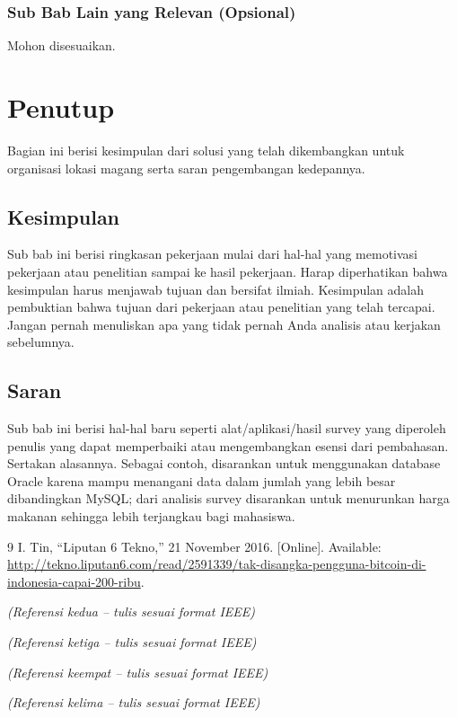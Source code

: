 \documentclass[a4paper,11pt,oneside]{report}
\begin{document}
\subsection{Sub Bab Lain yang Relevan (Opsional)}
Mohon disesuaikan.

\chapter{Penutup}
Bagian ini berisi kesimpulan dari solusi yang telah dikembangkan untuk
organisasi lokasi magang serta saran pengembangan kedepannya.

\section{Kesimpulan}
Sub bab ini berisi ringkasan pekerjaan mulai dari hal-hal yang memotivasi
pekerjaan atau penelitian sampai ke hasil pekerjaan. Harap diperhatikan bahwa
kesimpulan harus menjawab tujuan dan bersifat ilmiah. Kesimpulan adalah
pembuktian bahwa tujuan dari pekerjaan atau penelitian yang telah tercapai.
Jangan pernah menuliskan apa yang tidak pernah Anda analisis atau kerjakan
sebelumnya.

\section{Saran}
Sub bab ini berisi hal-hal baru seperti alat/aplikasi/hasil survey yang
diperoleh penulis yang dapat memperbaiki atau mengembangkan esensi dari
pembahasan. Sertakan alasannya. Sebagai contoh, disarankan untuk menggunakan
database Oracle karena mampu menangani data dalam jumlah yang lebih besar
dibandingkan MySQL; dari analisis survey disarankan untuk menurunkan harga
makanan sehingga lebih terjangkau bagi mahasiswa.

\renewcommand{\bibname}{Daftar Pustaka}
\begin{thebibliography}{9}
I. Tin, ``Liputan 6 Tekno,'' 21 November 2016. [Online]. Available:
\url{http://tekno.liputan6.com/read/2591339/tak-disangka-pengguna-bitcoin-di-indonesia-capai-200-ribu}.

\textit{(Referensi kedua -- tulis sesuai format IEEE)}

\textit{(Referensi ketiga -- tulis sesuai format IEEE)}

\textit{(Referensi keempat -- tulis sesuai format IEEE)}

\textit{(Referensi kelima -- tulis sesuai format IEEE)}
\end{thebibliography}
\end{document}
